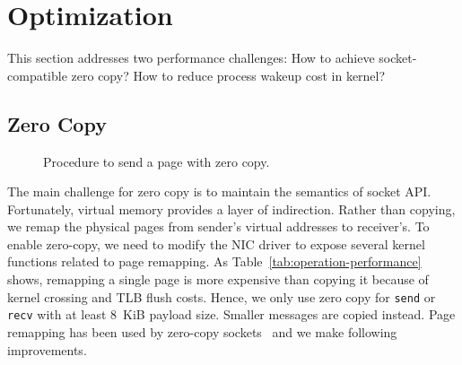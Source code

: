 \section{Optimization}
\label{sec:optimization}

This section addresses two performance challenges: How to achieve socket-compatible zero copy? How to reduce process wakeup cost in kernel?



\subsection{Zero Copy}
\label{subsec:zerocopy}

\begin{figure}[t]
	\centering
	\hspace{0.05\textwidth}
	\vspace{-10pt}
	\caption{Procedure to send a page with zero copy.}
\end{figure}



The main challenge for zero copy is to maintain the semantics of socket API.
Fortunately, virtual memory provides a layer of indirection. %
Rather than copying, we remap the physical pages from sender's virtual addresses to receiver's.
To enable zero-copy, we need to modify the NIC driver to expose several kernel functions related to page remapping. 
As Table~\ref{tab:operation-performance} shows, remapping a single page is more expensive than copying it because of kernel crossing and TLB flush costs. Hence, we only use zero copy for \texttt{send} or \texttt{recv} with at least 8~KiB payload size.
Smaller messages are copied instead.
Page remapping has been used by zero-copy sockets~\cite{thadani1995efficient,chu1996zero,linux-zero-copy} and we make following improvements.

